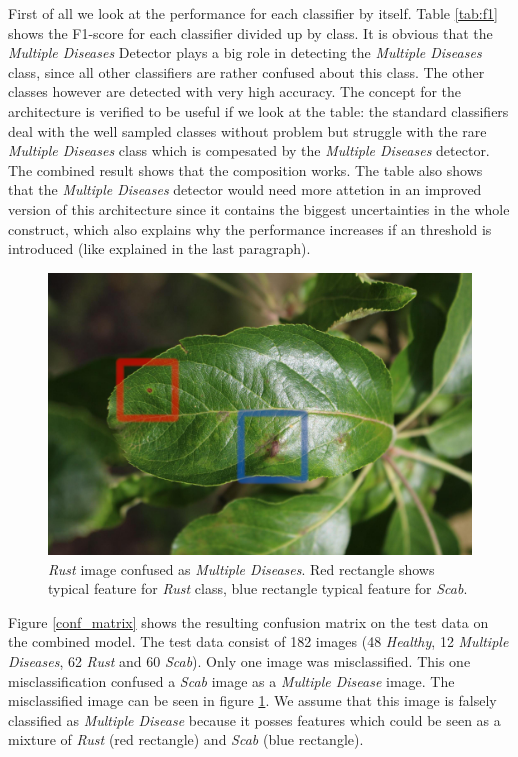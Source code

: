 \documentclass[10pt,twocolumn,letterpaper]{article}
\begin{document}
First of all we look at the performance for each classifier by itself. Table \ref{tab:f1} shows the F1-score for each classifier divided up by class. It is obvious that the \textit{Multiple Diseases} Detector plays a big role in detecting the \textit{Multiple Diseases} class, since all other classifiers are rather confused about this class. The other classes however are detected with very high accuracy. The concept for the architecture is verified to be useful if we look at the table: the standard classifiers deal with the well sampled classes without problem but struggle with the rare \textit{Multiple Diseases} class which is compesated by the \textit{Multiple Diseases} detector. The combined result shows that the composition works. The table also shows that the \textit{Multiple Diseases} detector would need more attetion in an improved version of this architecture since it contains the biggest uncertainties in the whole construct, which also explains why the performance increases if an threshold is introduced (like explained in the last paragraph).

\begin{figure}[htb]
\begin{center}
\includegraphics[width=\linewidth]{images/misclassified.jpg}
\end{center}
   \caption{\textit{Rust} image confused as \textit{Multiple Diseases}. Red rectangle shows typical feature for \textit{Rust} class, blue rectangle typical feature for \textit{Scab}.}
\label{miscl}  
\end{figure}

Figure \ref{conf_matrix} shows the resulting confusion matrix on the test data on the combined model. The test data consist of 182 images (48 \textit{Healthy}, 12 \textit{Multiple Diseases}, 62 \textit{Rust} and 60 \textit{Scab}). Only one image was misclassified. This one misclassification confused a \textit{Scab} image as a \textit{Multiple Disease} image. The misclassified image can be seen in figure \ref{miscl}. We assume that this image is falsely classified as \textit{Multiple Disease} because it posses features which could be seen as a mixture of \textit{Rust} (red rectangle) and \textit{Scab} (blue rectangle). 
\end{document}
